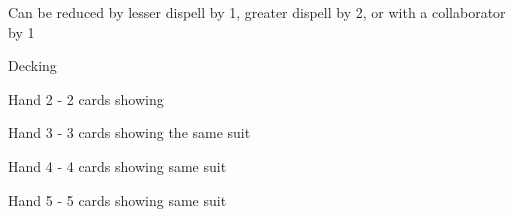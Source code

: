 \documentclass[green]{NeptuneBall}
\begin{document}
\name{\gDecking{}}

Can be reduced by lesser dispell by 1, greater dispell by 2, or with a collaborator by 1

Decking

Hand 2 - 2 cards showing %

Hand 3 - 3 cards showing the same suit %

Hand 4 - 4 cards showing same suit %

Hand 5 - 5 cards showing same suit %
\end{document}
